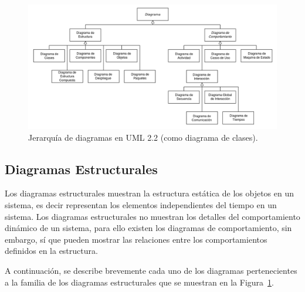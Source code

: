 \documentclass[a4paper, 12pt]{book}
\begin{document}
\begin{figure}
	\centering
	\includegraphics[width=16cm, keepaspectratio]{img/Uml_diagram.png}
	\caption{Jerarquía de diagramas en UML 2.2 (como diagrama de clases).}\label{fig:Uml_diagram}
\end{figure}

\subsection{Diagramas Estructurales}
Los diagramas estructurales muestran la estructura estática de los objetos en un sistema, es decir representan los elementos independientes del tiempo en un sistema. Los diagramas estructurales no muestran los detalles del comportamiento dinámico de un sistema, para ello existen los diagramas de comportamiento, sin embargo, sí que pueden mostrar las relaciones entre los comportamientos definidos en la estructura.  

A continuación, se describe brevemente cada uno de los diagramas pertenecientes a la familia de los diagramas estructurales que se muestran en la Figura~\ref{fig:Uml_diagram}.
\end{document}
